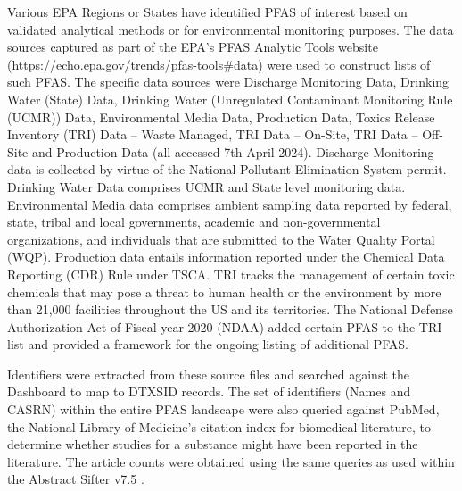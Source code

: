 \documentclass[
  super,
  preprint,
  3p]{elsarticle}
\begin{document}
Various EPA Regions or States have identified PFAS of interest based on
validated analytical methods or for environmental monitoring purposes.
The data sources captured as part of the EPA's PFAS Analytic Tools
website (\url{https://echo.epa.gov/trends/pfas-tools\#data}) were used
to construct lists of such PFAS. The specific data sources were
Discharge Monitoring Data, Drinking Water (State) Data, Drinking Water
(Unregulated Contaminant Monitoring Rule (UCMR)) Data, Environmental
Media Data, Production Data, Toxics Release Inventory (TRI) Data --
Waste Managed, TRI Data -- On-Site, TRI Data -- Off-Site and Production
Data (all accessed 7th April 2024). Discharge Monitoring data is
collected by virtue of the National Pollutant Elimination System permit.
Drinking Water Data comprises UCMR and State level monitoring data.
Environmental Media data comprises ambient sampling data reported by
federal, state, tribal and local governments, academic and
non-governmental organizations, and individuals that are submitted to
the Water Quality Portal (WQP). Production data entails information
reported under the Chemical Data Reporting (CDR) Rule under TSCA. TRI
tracks the management of certain toxic chemicals that may pose a threat
to human health or the environment by more than 21,000 facilities
throughout the US and its territories. The National Defense
Authorization Act of Fiscal year 2020 (NDAA) added certain PFAS to the
TRI list and provided a framework for the ongoing listing of additional
PFAS.

Identifiers were extracted from these source files and searched against
the Dashboard to map to DTXSID records. The set of identifiers (Names
and CASRN) within the entire PFAS landscape were also queried against
PubMed, the National Library of Medicine's citation index for biomedical
literature, to determine whether studies for a substance might have been
reported in the literature. The article counts were obtained using the
same queries as used within the Abstract Sifter v7.5
\citep{baker_abstract_2017}.
\end{document}
